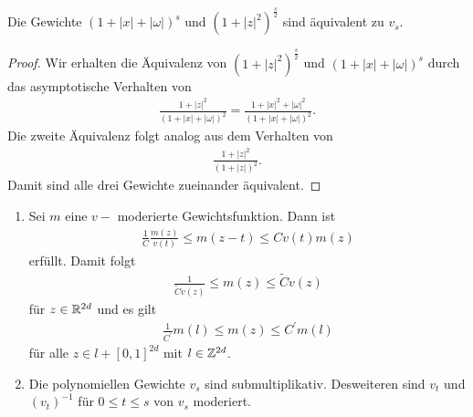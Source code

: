 \begin{lem}\label{th:equivalence_poly_weight}
	Die Gewichte $ (1 + |x| + |\omega|)^s $ und $ (1 + |z|^2)^{\frac{s}{2}} $
	sind äquivalent zu $ v_s $.
\end{lem}

\begin{proof}
	Wir erhalten die Äquivalenz von $ (1 + |z|^2)^{\frac{s}{2}}  $ und $ (1+|x|+|\omega|)^s $ durch das asymptotische Verhalten von
	\begin{align*}
	\frac{1+ |z|^2}{(1 + |x| + |\omega|)^2}
	=
	\frac{1+ |x|^2 + |\omega|^2}{(1 + |x| + |\omega|)^2}.
	\end{align*}
	Die zweite Äquivalenz folgt analog aus dem Verhalten von 
	\begin{align*}
	\frac{1+ |z|^2}{(1+|z|)^2}. 
	\end{align*}
	Damit sind alle drei Gewichte zueinander äquivalent.
\end{proof}




\begin{lem}\label{korrolary_1_weightfunctions}
	
	\begin{enumerate}[label =\textbf{(\roman*)}]
		\item
		Sei $ m $ eine $ v-$ moderierte Gewichtsfunktion. Dann ist
		\begin{align}\label{eq:v_mod_prop_1}
		\frac{1}{C} \frac{m(z)}{v(t)} \leq m(z- t) \leq Cv(t) m(z)
		\end{align}
		erfüllt. Damit folgt
		\begin{align}\label{eq:v_mod_prop_3}
		\frac{1}{\tilde{C} v(z) } \leq m(z) \leq \tilde{C}   v(z)
		\end{align}
		für $ z \in \mathbb{R}^{2d} $ und es gilt
		\begin{align}\label{eq:v_mod_prop_2}
		\frac{1}{C^\prime} m(l)\leq m(z) \leq C^\prime m(l)
		\end{align}
		für alle $ z \in l + [0,1]^{2d} $ mit $ l \in \mathbb{Z}^{2d} $.
		
		\item 
		Die polynomiellen Gewichte $ v_s $ sind submultiplikativ.
		Desweiteren sind $ v_t $ und $ (v_t)^{-1} $ für $ 0 \leq t \leq s $ von $ v_s $ moderiert.
		
%		 
	\end{enumerate}
	
\end{lem}

